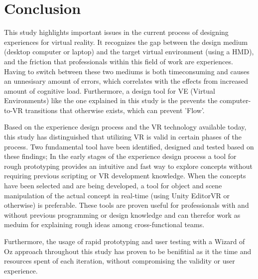 \chapter{Conclusion}
This study highlights important issues in the current process of designing experiences for virtual reality. It recognizes the gap between the design medium (desktop computer or laptop) and the target virtual environment (using a HMD), and the friction that professionals within this field of work are experiences. Having to switch between these two mediums is both timeconsuming and causes an unnesisary amount of errors, which correlates with the effects from increased amount of cognitive load. Furthermore, a design tool for VE (Virtual Environments) like the one explained in this study is the prevents the computer-to-VR transitions that otherwise exists, which can prevent 'Flow'.

Based on the experience design process and the VR technology available today, this study has distinguished that utilizing VR is valid in certain phases of the process. Two fundamental tool have been identified, designed and tested based on these findings; In the early stages of the experience design process a tool for rough prototyping provides an intuitive and fast way to explore concepts without requiring previous scripting or VR development knowledge. When the concepts have been selected and are being developed, a tool for object and scene manipulation of the actual concept in real-time (using Unity EditorVR or otherwise) is preferable. These tools are proven useful for professionals with and without previous programming or design knowledge and can therefor work as meduim for explaining rough ideas among cross-functional teams.

Furthermore, the usage of rapid prototyping and user testing with a Wizard of Oz approach throughout this study has proven to be benifitial as it the time and resources spent of each iteration, without compromising the validity or user experience.
